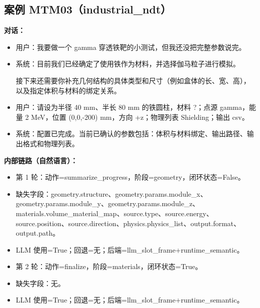 \documentclass[11pt]{ctexart}
\begin{document}
\subsection{案例 MTM03（industrial\_ndt）}
\textbf{对话：}
\begin{itemize}
\item 用户：我要做一个 gamma 穿透铁靶的小测试，但我还没把完整参数说完。
\item 系统：目前我们已经确定了使用铁作为材料，并选择伽马粒子进行模拟。

接下来还需要你补充几何结构的具体类型和尺寸（例如盒体的长、宽、高），以及指定体积与材料的绑定关系。
\item 用户：请设为半径 40 mm、半长 80 mm 的铁圆柱，材料 ?；点源 gamma，能量 2 MeV，位置 (0,0,-200) mm，方向 +z；物理列表 Shielding；输出 csv。
\item 系统：配置已完成。当前已确认的参数包括：体积与材料绑定、输出路径、输出格式和物理列表。
\end{itemize}
\textbf{内部链路（自然语言）：}
\begin{itemize}
\item 第 1 轮：动作=summarize\_progress，阶段=geometry，闭环状态=False。
\item 缺失字段：geometry.structure、geometry.params.module\_x、geometry.params.module\_y、geometry.params.module\_z、materials.volume\_material\_map、source.type、source.energy、source.position、source.direction、physics.physics\_list、output.format、output.path。
\item LLM 使用=True；回退=无；后端=llm\_slot\_frame+runtime\_semantic。
\item 第 2 轮：动作=finalize，阶段=materials，闭环状态=True。
\item 缺失字段：无。
\item LLM 使用=True；回退=无；后端=llm\_slot\_frame+runtime\_semantic。
\end{itemize}
\end{document}
